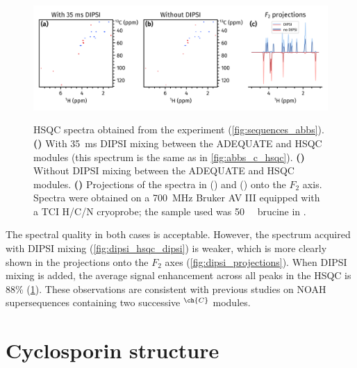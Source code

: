 \documentclass[a4paper,12pt]{article}
\newcommand{\carbon}{\ch{^{13}C}}
\newcommand{\magn}[1]{\ch{^1H}$^{#1}$}
\newcommand*{\brucine}{Spectra were obtained on a \SI{700}{\MHz} Bruker AV III equipped with a TCI H/C/N cryoprobe; the sample used was \SI{50}{\milli\molar} brucine in \ch{CDCl3}.}
\begin{document}
\begin{refsection}
\begin{figure}[ht]
    \centering
    \includegraphics[width=\textwidth]{dipsi.png}
    {\label{fig:dipsi_hsqc_nodipsi}}
    {\label{fig:dipsi_hsqc_dipsi}}
    {\label{fig:dipsi_projections}}
    \caption{
        \carbon{} HSQC spectra obtained from the  experiment (\cref{fig:sequences_abbs}).
        \textbf{()} With \SI{35}{\ms} DIPSI mixing between the ADEQUATE and \carbon{} HSQC modules (this spectrum is the same as in \cref{fig:abbs_c_hsqc}).
        \textbf{()} Without DIPSI mixing between the ADEQUATE and \carbon{} HSQC modules.
        \textbf{()} Projections of the spectra in () and () onto the $F_2$ axis.
        \brucine{}
    }
    \label{fig:dipsi}
\end{figure}

The spectral quality in both cases is acceptable.
However, the spectrum acquired with DIPSI mixing (\cref{fig:dipsi_hsqc_dipsi}) is weaker, which is more clearly shown in the projections onto the $F_2$ axes (\cref{fig:dipsi_projections}).
When DIPSI mixing is added, the average signal enhancement across all peaks in the HSQC is 88\% (\cref{fig:dipsi}).
These observations are consistent with previous studies on NOAH supersequences containing two successive \magn{\ch{C}} modules.\autocite{Yong2021JMR}


\clearpage

\section{Cyclosporin structure}


\end{refsection}
\end{document}
